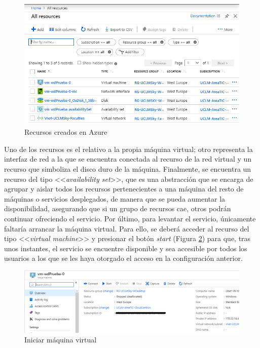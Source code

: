 \begin{figure}[h]
  \centering
  \includegraphics[width=0.8\linewidth]{figures/images/recursos_azure.PNG}
  \caption{Recursos creados en Azure}
  \label{fig:recursos_azure}
\end{figure}

Uno de los recursos es el relativo a la propia máquina virtual; otro representa la interfaz de red a la que se encuentra conectada al recurso de la red virtual y un recurso que simboliza el disco duro de la máquina. Finalmente, se encuentra un recurso del tipo <<\textit{availability set}>>, que es una abstracción que se encarga de agrupar y aislar todos los recursos pertenecientes a una máquina del resto de máquinas o servicios desplegados, de manera que se pueda aumentar la disponibilidad, asegurando que si un grupo de recursos cae, otros podrán continuar ofreciendo el servicio. Por último, para levantar el servicio, únicamente faltaría arrancar la máquina virtual. Para ello, se deberá acceder al recurso del tipo <<\textit{virtual machine}>> y presionar el botón \textit{start} (Figura \ref{fig:iniciar_mv}) para que, tras unos instantes, el servicio se encuentre disponible y sea accesible por todos los usuarios a los que se les haya otorgado el acceso en la configuración anterior.

\begin{figure}[h]
  \centering
  \includegraphics[width=0.9\linewidth]{figures/images/iniciar_mv.PNG}
  \caption{Iniciar máquina virtual}
  \label{fig:iniciar_mv}
\end{figure}

